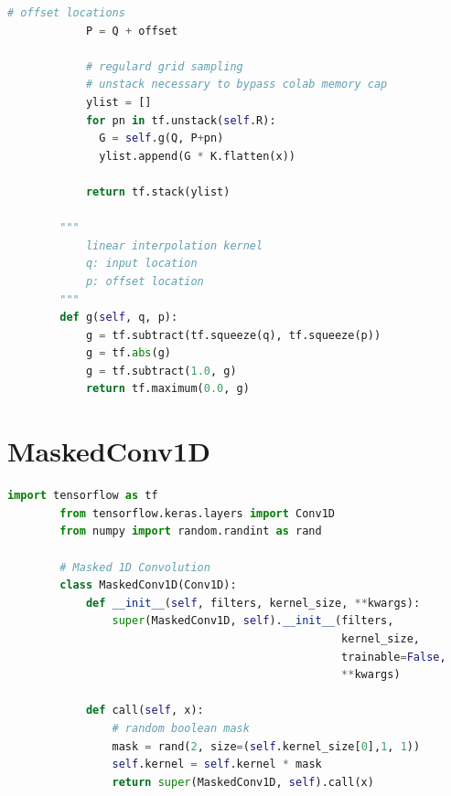 \documentclass[12pt,a4paper]{report}
\begin{document}
\begin{lstlisting}[language=Python]
            # offset locations
            P = Q + offset
    
            # regulard grid sampling
            # unstack necessary to bypass colab memory cap
            ylist = []
            for pn in tf.unstack(self.R):
              G = self.g(Q, P+pn)
              ylist.append(G * K.flatten(x))
    
            return tf.stack(ylist)
    
        """
            linear interpolation kernel
            q: input location
            p: offset location
        """
        def g(self, q, p):
            g = tf.subtract(tf.squeeze(q), tf.squeeze(p))
            g = tf.abs(g)
            g = tf.subtract(1.0, g)
            return tf.maximum(0.0, g)
        \end{lstlisting}
    
        \section{MaskedConv1D} \label{code:mask}
        \begin{lstlisting}[language=Python]
        import tensorflow as tf
        from tensorflow.keras.layers import Conv1D
        from numpy import random.randint as rand
        
        # Masked 1D Convolution
        class MaskedConv1D(Conv1D):
            def __init__(self, filters, kernel_size, **kwargs):
                super(MaskedConv1D, self).__init__(filters, 
                                                   kernel_size, 
                                                   trainable=False,
                                                   **kwargs)
        
            def call(self, x):
                # random boolean mask
                mask = rand(2, size=(self.kernel_size[0],1, 1))
                self.kernel = self.kernel * mask
                return super(MaskedConv1D, self).call(x)
        \end{lstlisting}


\end{document}
